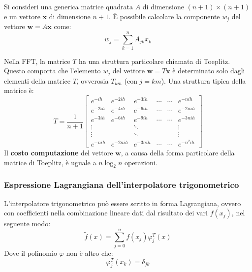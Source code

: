\highspace
Si consideri una generica matrice quadrata $A$ di dimensione $\left(n+1\right) \times \left(n+1\right)$ e un vettore $\mathbf{x}$ di dimensione $n+1$. È possibile calcolare la componente $w_{j}$ del vettore $\mathbf{w} = A\mathbf{x}$ come:
\begin{equation}
	w_{j} = \displaystyle\sum_{k=1}^{n} A_{jk} x_{k}
\end{equation}

\highspace
Nella FFT, la matrice $T$ ha una struttura particolare chiamata di Toeplitz. Questo comporta che l'elemento $w_{j}$ del vettore $\mathbf{w} = T\mathbf{x}$ è determinato solo dagli elementi della matrice $T$, ovverosia $T_{km}$ (con $j = km$). Una struttura tipica della matrice è:
\begin{equation*}
	T = \dfrac{1}{n+1} \begin{bmatrix}
		e^{-ih} & e^{-2ih} & e^{-3ih} & \cdots & \cdots & e^{-nih} \\
		e^{-2ih} & e^{-4ih} & e^{-6ih} & \cdots & \cdots & e^{-2nih} \\
		e^{-3ih} & e^{-6ih} & e^{-9ih} & \cdots & \cdots & e^{-3nih} \\
		\vdots & & \ddots & & & \vdots \\
		\vdots & & \ddots & & & \vdots \\
		e^{-nih} & e^{-2nih} & e^{-3nih} & \cdots & \cdots & e^{-n^{2}ih}
	\end{bmatrix}
\end{equation*}
Il \textbf{costo computazione} del vettore $\mathbf{w}$, a causa della forma particolare della matrice di Toeplitz, è uguale a \underline{$n \log_{2} n$ operazioni}.

\longline

\subsubsection{Espressione Lagrangiana dell'interpolatore trigonometrico}

L'interpolatore trigonometrico può essere scritto in forma Lagrangiana, ovvero con coefficienti nella combinazione lineare dati dal risultato dei vari $f\left(x_{j}\right)$, nel seguente modo:
\begin{equation}
	\tilde{f}\left(x\right) = \displaystyle\sum_{j=0}^{n} f\left(x_{j}\right) \varphi_{j}^{T}\left(x\right)
\end{equation}
Dove il polinomio $\varphi$ non è altro che:
\begin{equation}
	\varphi_{j}^{T}\left(x_{k}\right) = \delta_{jk}
\end{equation}

